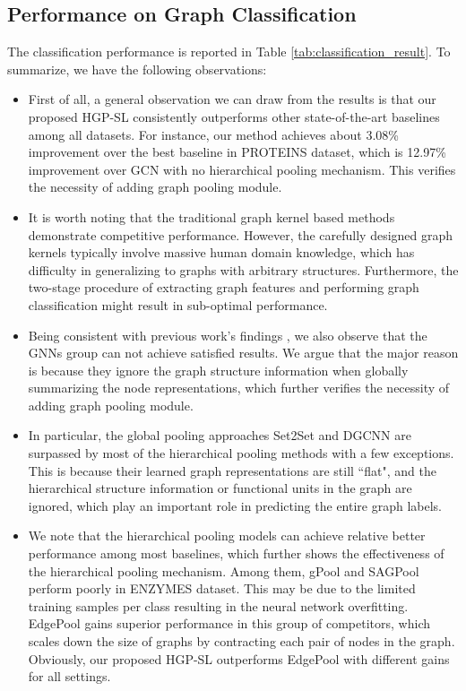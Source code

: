 \documentclass[letterpaper]{article} \usepackage{aaai20}  \usepackage{times}  \usepackage{helvet} \usepackage{courier}  \usepackage[hyphens]{url}  \usepackage{graphicx} \urlstyle{rm} \def\UrlFont{\rm}  \usepackage{graphicx}  \frenchspacing  \setlength{\pdfpagewidth}{8.5in}  \setlength{\pdfpageheight}{11in}
\begin{document}
\subsection{Performance on Graph Classification}
The classification performance is reported in Table \ref{tab:classification_result}. To summarize, we have the following observations:
\begin{itemize}
	\item First of all, a general observation we can draw from the results is that our proposed HGP-SL consistently outperforms other state-of-the-art baselines among all datasets. For instance, our method achieves about 3.08\% improvement over the best baseline in PROTEINS dataset, which is 12.97\% improvement over GCN with no hierarchical pooling mechanism. This verifies the necessity of adding graph pooling module.
	\item It is worth noting that the traditional graph kernel based methods demonstrate competitive performance. However, the carefully designed graph kernels typically involve massive human domain knowledge, which has difficulty in generalizing to graphs with arbitrary structures. Furthermore, the two-stage procedure of extracting graph features and performing graph classification might result in sub-optimal performance.
	\item Being consistent with previous work's findings \cite{ma2019graph}, we also observe that the GNNs group can not achieve satisfied results. We argue that the major reason is because they ignore the graph structure information when globally summarizing the node representations, which further verifies the necessity of adding graph pooling module.
	\item In particular, the global pooling approaches Set2Set and DGCNN are surpassed by most of the hierarchical pooling methods with a few exceptions. This is because their learned graph representations are still ``flat", and the hierarchical structure information or functional units in the graph are ignored, which play an important role in predicting the entire graph labels.
	\item We note that the hierarchical pooling models can achieve relative better performance among most baselines, which further shows the effectiveness of the hierarchical pooling mechanism. Among them, gPool and SAGPool perform poorly in ENZYMES dataset. This may be due to the limited training samples per class resulting in the neural network overfitting. EdgePool gains superior performance in this group of competitors, which scales down the size of graphs by contracting each pair of nodes in the graph. Obviously, our proposed HGP-SL outperforms EdgePool with different gains for all settings.

\end{itemize}
\end{document}
